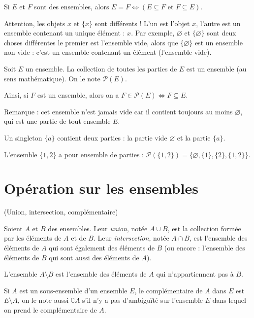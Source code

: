 \begin{remarque} Si $E$ et $F$ sont des ensembles, alors 
$
E=F \iff \left(E\subseteq F \text{ et } F \subseteq E\right).
$
\end{remarque}


\begin{remarque}
Attention, les objets $x$ et $\{x\}$ sont différents ! L'un est l'objet $x$, l'autre est un ensemble contenant un unique élément : $x$. Par exemple, $\varnothing$ et $\{\varnothing\}$ sont deux choses différentes le premier est l'ensemble vide, alors que $\{\varnothing\}$ est un ensemble non vide : c'est un ensemble contenant un élément (l'ensemble vide).
\end{remarque}

\begin{axiomedef}
Soit $E$ un ensemble. La collection de toutes les parties de $E$ est un ensemble (au sens mathématique). On le note $\mathcal P(E)$. 

Ainsi, si $F$ est un ensemble, alors on a $F\in \mathcal P(E) \iff F\subseteq E$.
\end{axiomedef}

Remarque : cet ensemble n'est jamais vide car il contient toujours au moins $\varnothing$, qui est une partie de  tout ensemble $E$.

\begin{exemple}Un singleton $\{a\}$ contient deux parties : la partie vide $\varnothing$ et la partie $\{a\}$. 

L'ensemble $\{1,2\}$ a pour ensemble de parties :  $\mathcal P(\{1,2\}) = \{\varnothing,\{1\},\{2\},\{1,2\}\}$.
\end{exemple}


\section{Opération sur les ensembles}

\begin{definition}(Union, intersection, complémentaire)

Soient $A$ et $B$ des ensembles. Leur \emph{union}, notée $A\cup B$, est la collection formée par les éléments de $A$ et de $B$. Leur \emph{intersection}, notée $A\cap B$, est l'ensemble des éléments de $A$ qui sont également des éléments de $B$ (ou encore : l'ensemble des éléments de $B$ qui sont aussi des éléments de $A$). 

L'ensemble $A\setminus B$ est l'ensemble des éléments de $A$ qui n'appartiennent pas à $B$.

Si $A$ est un sous-ensemble d'un ensemble $E$, le complémentaire de $A$ dans $E$ est $E\setminus A$, on le note aussi $\complement A$ s'il n'y a pas d'ambiguïté sur l'ensemble $E$ dans lequel on prend le complémentaire de $A$.
\end{definition}


